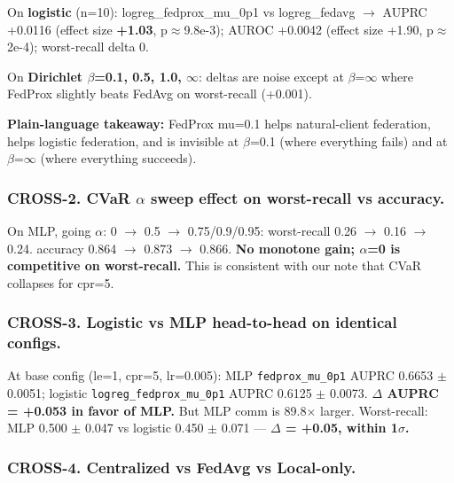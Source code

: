 \documentclass{article}
\begin{document}
On \textbf{logistic} (n=10): logreg\_fedprox\_mu\_0p1 vs logreg\_fedavg \ensuremath{\rightarrow} AUPRC +0.0116 (effect size \textbf{+1.03}, p\ensuremath{\approx}9.8e-3); AUROC +0.0042 (effect size +1.90, p\ensuremath{\approx}2e-4); worst-recall delta 0.


On \textbf{Dirichlet \ensuremath{\beta}=0.1, 0.5, 1.0, \ensuremath{\infty}}: deltas are noise except at \ensuremath{\beta}=\ensuremath{\infty} where FedProx slightly beats FedAvg on worst-recall (+0.001).


\textbf{Plain-language takeaway:} FedProx mu=0.1 helps natural-client federation, helps logistic federation, and is invisible at \ensuremath{\beta}=0.1 (where everything fails) and at \ensuremath{\beta}=\ensuremath{\infty} (where everything succeeds).


\subsubsection{CROSS-2. CVaR \ensuremath{\alpha} sweep effect on worst-recall vs accuracy.}


On MLP, going \ensuremath{\alpha}: 0 \ensuremath{\rightarrow} 0.5 \ensuremath{\rightarrow} 0.75/0.9/0.95: worst-recall 0.26 \ensuremath{\rightarrow} 0.16 \ensuremath{\rightarrow} 0.24. accuracy 0.864 \ensuremath{\rightarrow} 0.873 \ensuremath{\rightarrow} 0.866. \textbf{No monotone gain; \ensuremath{\alpha}=0 is competitive on worst-recall.} This is consistent with our note that CVaR collapses for cpr=5.


\subsubsection{CROSS-3. Logistic vs MLP head-to-head on identical configs.}


At base config (le=1, cpr=5, lr=0.005): MLP \texttt{fedprox\_mu\_0p1} AUPRC 0.6653 \ensuremath{\pm} 0.0051; logistic \texttt{logreg\_fedprox\_mu\_0p1} AUPRC 0.6125 \ensuremath{\pm} 0.0073. \textbf{\ensuremath{\Delta} AUPRC = +0.053 in favor of MLP.} But MLP comm is 89.8\ensuremath{\times} larger. Worst-recall: MLP 0.500 \ensuremath{\pm} 0.047 vs logistic 0.450 \ensuremath{\pm} 0.071 --- \textbf{\ensuremath{\Delta} = +0.05, within 1\ensuremath{\sigma}.}


\subsubsection{CROSS-4. Centralized vs FedAvg vs Local-only.}
\end{document}
